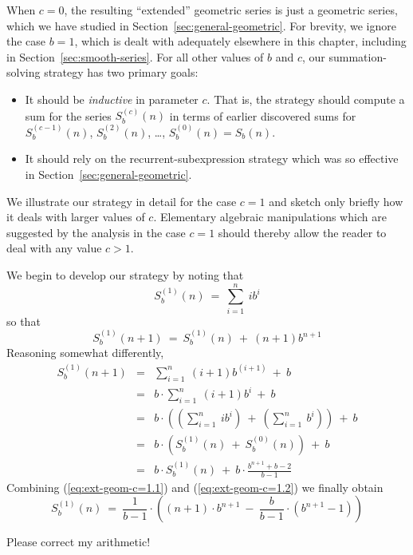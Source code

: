 When $c=0$, the resulting ``extended'' geometric series is just a
geometric series, which we have studied in
Section~\ref{sec:general-geometric}.  For brevity, we ignore the case
$b = 1$, which is dealt with adequately elsewhere in this chapter,
including in Section~\ref{sec:smooth-series}.  For all other values of
$b$ and $c$, our summation-solving strategy has two primary goals:
\begin{itemize}
\item
It should be {\em inductive} in parameter $c$.  That is, the strategy
should compute a sum for the series $S_b^{(c)}(n)$ in terms of earlier
discovered sums for $S_b^{(c-1)}(n)$, $S_b^{(2)}(n)$, \ldots,
$S_b^{(0)}(n) = S_b(n)$.

\item
It should rely on the recurrent-subexpression strategy which was so
effective in Section~\ref{sec:general-geometric}.
\end{itemize}
We illustrate our strategy in detail for the case $c=1$ and sketch
only briefly how it deals with larger values of $c$.  Elementary
algebraic manipulations which are suggested by the analysis in the
case $c=1$ should thereby allow the reader to deal with any value $c >
1$.

We begin to develop our strategy by noting that
\[ S_b^{(1)}(n) \ = \ \sum_{i=1}^n \ i b^i  \]
so that
\begin{equation}
\label{eq:ext-geom-c=1.1}
S_b^{(1)}(n+1) \ = \ S_b^{(1)}(n) \ + \ (n+1) b^{n+1}
\end{equation}
Reasoning somewhat differently,
\begin{eqnarray*}
S_b^{(1)}(n+1)
     & = &
\sum_{i=1}^n \ (i+1) b^{(i+1)} \ + \ b \\
     & = &
b \cdot \sum_{i=1}^n \ (i+1) b^i \ + \ b \\
     & = &
b \cdot \left(
\left(\sum_{i=1}^n \ i b^i \right)
 \ + \
\left( \sum_{i=1}^n \  b^i \right)
\right) \ + \ b \\
     & = &
b \cdot \left( S_b^{(1)}(n) \ + \ S_b^{(0)}(n) \right) \ + \ b \\
\label{eq:ext-geom-c=1.2}
    & = &
b \cdot S_b^{(1)}(n) \ + \ b \cdot \frac{b^{n+1} + b - 2}{b-1}
\end{eqnarray*}
Combining (\ref{eq:ext-geom-c=1.1}) and (\ref{eq:ext-geom-c=1.2}) we
finally obtain
\[ S_b^{(1)}(n) \ = \
\frac{1}{b-1} \cdot \left(
(n+1) \cdot b^{n+1}
  \ - \
\frac{b}{b-1} \cdot (b^{n+1} - 1)
\right)
\]

{\Arny Please correct my arithmetic!}


